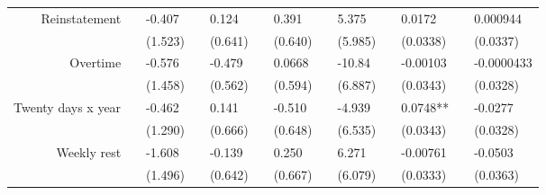 \begin{tabular}{rrrrrrrrrrrrr}
Reinstatement & \multicolumn{1}{l}{} & \multicolumn{1}{l}{-0.407} & \multicolumn{1}{l}{} & \multicolumn{1}{l}{0.124} & \multicolumn{1}{l}{} & \multicolumn{1}{l}{0.391} & \multicolumn{1}{l}{} & \multicolumn{1}{l}{5.375} & \multicolumn{1}{l}{} & \multicolumn{1}{l}{0.0172} & \multicolumn{1}{l}{} & \multicolumn{1}{l}{0.000944} \\
      & \multicolumn{1}{l}{} & \multicolumn{1}{l}{(1.523)} & \multicolumn{1}{l}{} & \multicolumn{1}{l}{(0.641)} & \multicolumn{1}{l}{} & \multicolumn{1}{l}{(0.640)} & \multicolumn{1}{l}{} & \multicolumn{1}{l}{(5.985)} & \multicolumn{1}{l}{} & \multicolumn{1}{l}{(0.0338)} & \multicolumn{1}{l}{} & \multicolumn{1}{l}{(0.0337)} \\
Overtime & \multicolumn{1}{l}{} & \multicolumn{1}{l}{-0.576} & \multicolumn{1}{l}{} & \multicolumn{1}{l}{-0.479} & \multicolumn{1}{l}{} & \multicolumn{1}{l}{0.0668} & \multicolumn{1}{l}{} & \multicolumn{1}{l}{-10.84} & \multicolumn{1}{l}{} & \multicolumn{1}{l}{-0.00103} & \multicolumn{1}{l}{} & \multicolumn{1}{l}{-0.0000433} \\
      & \multicolumn{1}{l}{} & \multicolumn{1}{l}{(1.458)} & \multicolumn{1}{l}{} & \multicolumn{1}{l}{(0.562)} & \multicolumn{1}{l}{} & \multicolumn{1}{l}{(0.594)} & \multicolumn{1}{l}{} & \multicolumn{1}{l}{(6.887)} & \multicolumn{1}{l}{} & \multicolumn{1}{l}{(0.0343)} & \multicolumn{1}{l}{} & \multicolumn{1}{l}{(0.0328)} \\
Twenty days x year & \multicolumn{1}{l}{} & \multicolumn{1}{l}{-0.462} & \multicolumn{1}{l}{} & \multicolumn{1}{l}{0.141} & \multicolumn{1}{l}{} & \multicolumn{1}{l}{-0.510} & \multicolumn{1}{l}{} & \multicolumn{1}{l}{-4.939} & \multicolumn{1}{l}{} & \multicolumn{1}{l}{0.0748**} & \multicolumn{1}{l}{} & \multicolumn{1}{l}{-0.0277} \\
      & \multicolumn{1}{l}{} & \multicolumn{1}{l}{(1.290)} & \multicolumn{1}{l}{} & \multicolumn{1}{l}{(0.666)} & \multicolumn{1}{l}{} & \multicolumn{1}{l}{(0.648)} & \multicolumn{1}{l}{} & \multicolumn{1}{l}{(6.535)} & \multicolumn{1}{l}{} & \multicolumn{1}{l}{(0.0343)} & \multicolumn{1}{l}{} & \multicolumn{1}{l}{(0.0328)} \\
Weekly rest & \multicolumn{1}{l}{} & \multicolumn{1}{l}{-1.608} & \multicolumn{1}{l}{} & \multicolumn{1}{l}{-0.139} & \multicolumn{1}{l}{} & \multicolumn{1}{l}{0.250} & \multicolumn{1}{l}{} & \multicolumn{1}{l}{6.271} & \multicolumn{1}{l}{} & \multicolumn{1}{l}{-0.00761} & \multicolumn{1}{l}{} & \multicolumn{1}{l}{-0.0503} \\
      & \multicolumn{1}{l}{} & \multicolumn{1}{l}{(1.496)} & \multicolumn{1}{l}{} & \multicolumn{1}{l}{(0.642)} & \multicolumn{1}{l}{} & \multicolumn{1}{l}{(0.667)} & \multicolumn{1}{l}{} & \multicolumn{1}{l}{(6.079)} & \multicolumn{1}{l}{} & \multicolumn{1}{l}{(0.0333)} & \multicolumn{1}{l}{} & \multicolumn{1}{l}{(0.0363)} \\

\end{tabular}
